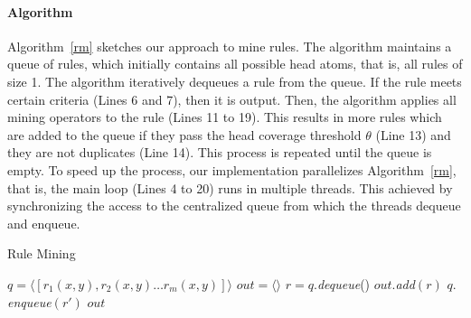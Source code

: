 \paragraph{Algorithm} \label{algo}
Algorithm~\ref{rm} sketches our approach to mine rules. The algorithm maintains a queue of rules, 
which initially contains all possible head atoms, that is,
all rules of size 1.
The algorithm iteratively dequeues a rule from the queue. If the rule 
meets certain criteria (Lines 6 and 7), then it is output.
Then, the algorithm applies all mining operators to the rule (Lines 11 to 19). This results in more rules which are added to 
the queue if they pass the head coverage threshold $\theta$ (Line 13) and they are not duplicates (Line 14).
This process is repeated until the queue is empty. 
To speed up the process, our implementation parallelizes Algorithm~\ref{rm}, that is, the main loop (Lines 4 to 20) runs
in multiple threads. 
This achieved by synchronizing the access to the centralized queue from which the threads dequeue and enqueue.



\begin{algorithm}
\caption{Rule Mining}
\label{rm}
\begin{algorithmic}[1]
    \State $q = \langle [r_1(x,y), r_2(x,y) \dots r_m(x,y)] \rangle$
    \State $out = \langle \rangle$
	  \State $r = q.$\emph{dequeue}()
	      \State $out.$\emph{add}$(r)$
	    \EndIf
	  \EndIf
		      \State $q.$\emph{enqueue}$(r')$
		    \EndIf
		  \EndIf
		\EndFor
	  \EndFor
	\EndWhile
    \State \Return $out$
\EndFunction
\end{algorithmic}
\end{algorithm}

